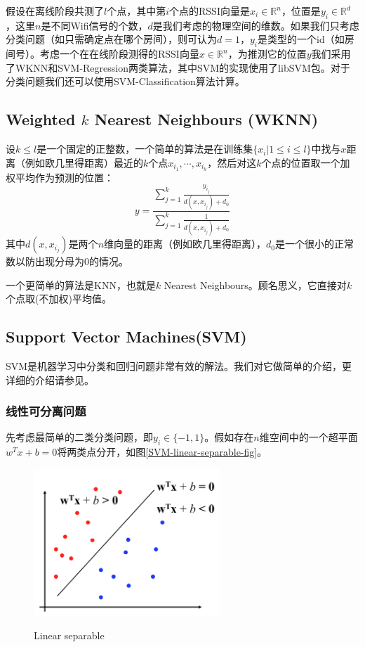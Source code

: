 \documentclass[a4paper,10pt]{article}
\begin{document}
\begin{CJK*}{UTF8}{gbsn}
假设在离线阶段共测了$l$个点，其中第$i$个点的RSSI向量是$x_i \in \mathbb R^n$，位置是$y_i \in \mathbb R^d$，这里$n$是不同Wifi信号的个数，$d$是我们考虑的物理空间的维数。如果我们只考虑分类问题（如只需确定点在哪个房间），则可认为$d = 1$，$y_i$是类型的一个id（如房间号）。考虑一个在在线阶段测得的RSSI向量$x\in \mathbb R^n$，为推测它的位置$y$我们采用了WKNN和SVM-Regression两类算法，其中SVM的实现使用了libSVM包\cite{2}。对于分类问题我们还可以使用SVM-Classification算法计算。

\subsection{Weighted $k$ Nearest Neighbours (WKNN)}
设$k\le l$是一个固定的正整数，一个简单的算法是在训练集$\{x_i | 1 \le i \le l\}$中找与$x$距离（例如欧几里得距离）最近的$k$个点$x_{i_1}, \cdots, x_{i_k}$，然后对这$k$个点的位置取一个加权平均作为预测的位置：
\[
y = \frac{\sum\limits_{j=1}^k \frac{y_{i_j}}{d(x, x_{i_j}) + d_0} }{\sum\limits_{j=1}^k \frac{1}{d(x, x_{i_j}) + d_0} }
\]
其中$d(x, x_{i_j})$是两个$n$维向量的距离（例如欧几里得距离），$d_0$是一个很小的正常数以防出现分母为0的情况。

一个更简单的算法是KNN，也就是$k$ Nearest Neighbours。顾名思义，它直接对$k$个点取(不加权)平均值。


\subsection{Support Vector Machines(SVM)}

SVM是机器学习中分类和回归问题非常有效的解法。我们对它做简单的介绍，更详细的介绍请参见\cite{3}。

\subsubsection{线性可分离问题}
先考虑最简单的二类分类问题，即$y_i \in \{-1, 1\}$。假如存在$n$维空间中的一个超平面$w^Tx+b = 0$将两类点分开，如图\eqref{SVM-linear-separable-fig}。
\begin{figure}[htbp]
\centering
\includegraphics[width=7cm]{SVM1.png}
   　　\caption{Linear separable}
   \label{SVM-linear-separable-fig}
\end{figure}


\end{CJK*}
\end{document}
